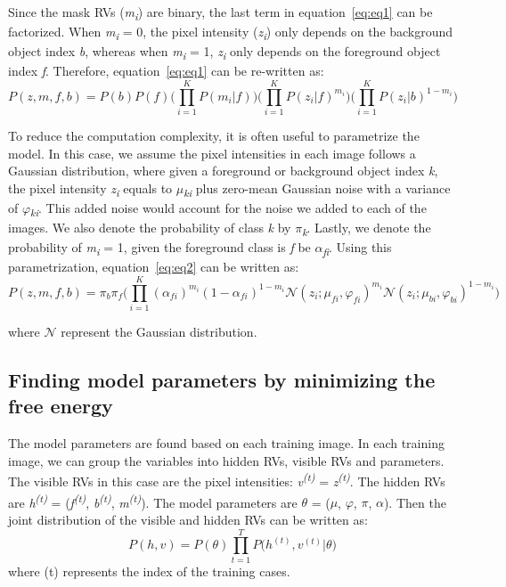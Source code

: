 \documentclass{article} %
\begin{document}
Since the mask RVs (\textit{m}\textsubscript{\textit{i}}) are binary, the last term in equation~\ref{eq:eq1} can be factorized. When \textit{m}\textsubscript{\textit{i}} = 0, the pixel intensity (\textit{z}\textsubscript{\textit{i}}) only depends on the background object index \textit{b}, whereas when \textit{m}\textsubscript{\textit{i}} = 1, \textit{z}\textsubscript{\textit{i}} only depends on the foreground object index \textit{f}. Therefore, equation~\ref{eq:eq1} can be re-written as:
\begin{equation}
P(z,m,f,b) = P(b)P(f)\Bigg( \prod_{i=1}^KP(m_{i}|f)\Bigg)\Bigg( \prod_{i=1}^KP(z_{i}|f)^{m_{i}}\Bigg)\Bigg( \prod_{i=1}^KP(z_{i}|b)^{1-m_{i}}\Bigg)
\label{eq:eq2}
\end{equation}

To reduce the computation complexity, it is often useful to parametrize the model. In this case, we assume the pixel intensities in each image follows a Gaussian distribution, where given a foreground or background object index \textit{k}, the pixel intensity \textit{z}\textsubscript{\textit{i}} equals to \textit{$\mu$}\textsubscript{\textit{ki}} plus zero-mean Gaussian noise with a variance of \textit{$\varphi$}\textsubscript{\textit{ki}}. This added noise would account for the noise we added to each of the images. We also denote the probability of class \textit{k} by \textit{$\pi$}\textsubscript{\textit{k}}. Lastly, we denote the probability of \textit{m}\textsubscript{\textit{i}} = 1, given the foreground class is \textit{f} be \textit{$\alpha$}\textsubscript{\textit{fi}}. Using this parametrization, equation~\ref{eq:eq2} can be written as:
\begin{equation}
P(z,m,f,b) = \pi_{b} \pi_{f} \Bigg( \prod_{i=1}^K {(\alpha_{fi})}^{m_{i}} {(1-\alpha_{fi})}^{1-m_{i}} \mathcal{N}(z_i;\mu_{fi},\varphi_{fi})^{m_{i}}\mathcal{N}(z_i;\mu_{bi},\varphi_{bi})^{1-m_{i}} \Bigg)
\label{eq:eq3}
\end{equation}

where $\mathcal{N}$ represent the Gaussian distribution. 

\subsection{Finding model parameters by minimizing the free energy }
\label{free_energy}
The model parameters are found based on each training image. In each training image, we can group the variables into hidden RVs, visible RVs and parameters. The visible RVs in this case are the pixel intensities: \textit{v}\textsuperscript{\textit{(t)}} = \textit{z}\textsuperscript{\textit{(t)}}. The hidden RVs are \textit{h}\textsuperscript{\textit{(t)}} = (\textit{f}\textsuperscript{\textit{(t)}}, \textit{b}\textsuperscript{\textit{(t)}}, \textit{m}\textsuperscript{\textit{(t)}}). The model parameters are \textit{$\theta$} = (\textit{$\mu$}, \textit{$\varphi$}, \textit{$\pi$}, \textit{$\alpha$}). Then the joint distribution of the visible and hidden RVs can be written as:
\begin{equation}
P(h,v) = P(\theta) \prod_{t=1}^TP\Big(h^{(t)}, v^{(t)}|\theta\Big) 
\label{eq:eq4}
\end{equation}
where (t) represents the index of the training cases.
\end{document}
